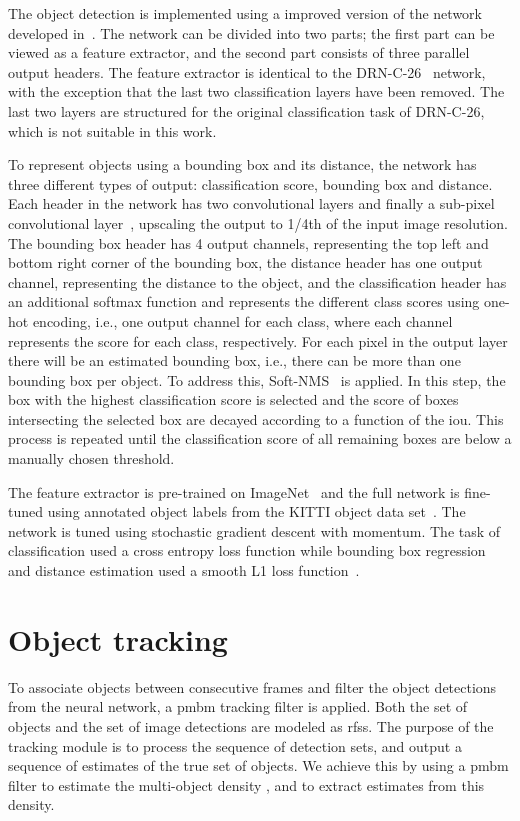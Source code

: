 \documentclass[conference]{IEEEtran}
\begin{document}
The object detection is implemented using a improved version of the network developed in~\cite{Krishnan2016}.
The network can be divided into two parts; the first part can be viewed as a feature extractor, and the second part consists of three parallel output headers.
The feature extractor is identical to the DRN-C-26~\cite{Yu2017} network, with the exception that the last two classification layers have been removed.
The last two layers are structured for the original classification task of DRN-C-26, which is not suitable in this work.

To represent objects using a bounding box and its distance, the network has three different types of output: classification score, bounding box and distance.
Each header in the network has two  convolutional layers and finally a sub-pixel convolutional layer~\cite{Shi2016}, upscaling the output to 1/4th of the input image resolution.
The bounding box header has 4 output channels, representing the top left and bottom right corner of the bounding box, the distance header has one output channel, representing the distance to the object, and the classification header has an additional softmax function and represents the different class scores using one-hot encoding, i.e., one output channel for each class, where each channel represents the score for each class, respectively.
For each pixel in the output layer there will be an estimated bounding box, i.e., there can be more than one bounding box per object.
To address this, Soft-NMS~\cite{Bodla2017} is applied.
In this step, the box with the highest classification score is selected and the score of boxes intersecting the selected box are decayed according to a function of the \gls{iou}.
This process is repeated until the classification score of all remaining boxes are below a manually chosen threshold.


The feature extractor is pre-trained on ImageNet~\cite{JiaDeng2009} and the full network is fine-tuned using annotated object labels from the KITTI object data set~\cite{Geiger2012CVPR}.
The network is tuned using stochastic gradient descent with momentum. The task of classification used a cross entropy loss function while bounding box regression and distance estimation used a smooth L1 loss function~\cite{Girshick2015}.

 
\section{Object tracking}
\label{sec:Tracking}
To associate objects between consecutive frames and filter the object detections from the neural network, a \gls{pmbm} tracking filter is applied.
Both the set of objects  and the set of image detections  are modeled as \glspl{rfs}. The purpose of the tracking module is to process the sequence of detection sets, and output a sequence of estimates  of the true set of objects. We achieve this by using a \gls{pmbm} filter to estimate the multi-object density , and to extract estimates from this density.
\end{document}
